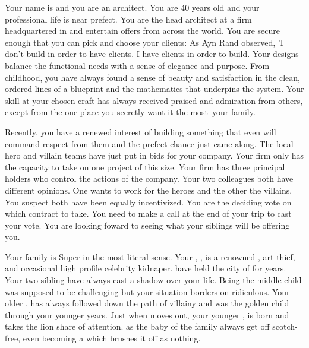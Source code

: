 \documentclass[char]{LRSguildcamp1}
\begin{document}
\name{\cArchitect{}}


Your name is \cArchitect{\intro} and you are an architect. You are 40 years old and your professional life is near prefect. You are the head architect at a firm headquartered in \pCityArchitect{} and entertain offers from across the world.  You are secure enough that you can pick and choose your clients: As Ayn Rand observed, 'I don't build in order to have clients. I have clients in order to build. Your designs balance the functional needs with a sense of elegance and purpose. From childhood, you have always found a sense of beauty and satisfaction in the clean, ordered lines of a blueprint and the mathematics that underpins the system. Your skill at your chosen craft has always received praised and admiration from others, except from the one place you secretly want it the most--your family. 

Recently, you have a renewed interest of building something that even will command respect from them and the prefect chance just came along. The local hero and villain teams \pCityArchitect{} have just put in bids for your company. Your firm only has the capacity to take on one project of this size. Your firm has three principal holders who control the actions of the company. Your two colleagues both have different opinions. One wants to work for the heroes and the other the villains. You suspect both have been equally incentivized. You are the deciding vote on which contract to take. You need to make a call at the end of your trip to cast your vote. You are looking foward to seeing what your siblings will be offering you.  

Your family is Super in the most literal sense. Your \cGrandma{\parent}, \cGrandma{}, is a renowned \cGrandma{\villain}, art thief, and occasional high profile celebrity kidnaper. \cGrandma{\They} have held the city of \pCityGrandma{} for years. Your two sibling have always cast a shadow over your life. Being the middle child was supposed to be challenging but your situation borders on ridiculous. Your older \cOldest{\sibling}, \cOldest{} has always followed \cGrandma{} down the path of villainy and was the golden child through your younger years. Just when \cOldest{} moves out, your younger \cYoungest{\sibling}, \cYoungest{} is born and takes the lion share of attention. \cYoungest{\They} as the baby of the family always get off scotch-free, even becoming a \cYoungest{\hero} which \cGrandma{} brushes it off as nothing. 
\end{document}
